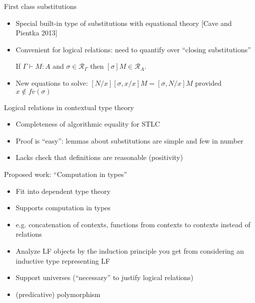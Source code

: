 \documentclass[usenames,dvipsnames]{beamer}
\begin{document}
\begin{frame}{First class substitutions}
\begin{itemize}
\item Special built-in type of substitutions with equational theory [Cave and Pientka 2013]
\item Convenient for logical relations: need to quantify over ``closing substitutions''
\begin{theorem}
If $\Gamma \vdash M : A$ {\color{purple} and $\sigma \in \mathcal{R}_\Gamma$} then
$[\sigma]M \in \mathcal{R}_A$.
\end{theorem}
\item New equations to solve: $[N/x][\sigma,x/x]M = [\sigma,N/x]M$ provided $x \not\in fv(\sigma)$
\end{itemize}
\end{frame}

\begin{frame}{Logical relations in contextual type theory}
\begin{itemize}
\item Completeness of algorithmic equality for STLC
\item Proof is ``easy'': lemmas about substitutions are simple and few in number
\item Lacks check that definitions are reasonable (positivity)
\end{itemize}
\end{frame}


\begin{frame}{Proposed work: ``Computation in types''}
\begin{itemize}
\item Fit into dependent type theory
\item Supports computation in types
\item e.g. concatenation of contexts, functions from contexts to contexts instead of relations
\item Analyze LF objects by the induction principle you get from considering an inductive type representing LF
\item Support universes (``necessary'' to justify logical relations)
\item (predicative) polymorphism
\end{itemize}
\end{frame}
\end{document}
